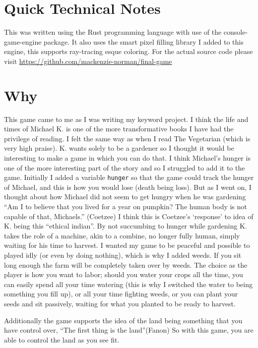 \documentclass{article}
\begin{document}
\section*{Quick Technical Notes }
This was written using the Rust programming language with use of the console-game-engine package. It also uses the smart pixel filling library I added to this engine, this supports ray-tracing esque coloring. For the actual source code please visit \url{https://github.com/mackenzie-norman/final-game}


\section*{Why}
This game came to me as I was writing my keyword project. I think the life and times of Michael K. is one of the more transformative books I have had the privilege of reading. I felt the same way as when I read The Vegetarian (which is very high praise).
K. wants solely to be a gardener so I thought it would be interesting to make a game in which you can do that. I think Michael's hunger is one of the more interesting part of the story and so I struggled to add it to the game. Initially I added a variable \lstinline[language=c]|hunger| so that the game could track the hunger of Michael, and this is how you would lose (death being loss). But as I went on, I thought about how Michael did not seem to get hungry when he was gardening ``Am I to believe that you lived for a year on pumpkin? The human body is not capable of that, Michaels.'' (Coetzee)
I think this is Coetzee's `response' to idea of K. being this ``ethical indian''. By not succumbing to hunger while gardening K. takes the role of a machine, akin to a combine, no longer fully human, simply waiting for his time to harvest. 
I wanted my game to be peaceful and possible to played idly (or even by doing nothing), which is why I added weeds. If you sit long enough the farm will be completely taken over by weeds. The choice as the player is how you want to labor; should you water your crops all the time, you can easily spend all your time watering (this is why I switched the water to being something you fill up), or all your time fighting weeds, or you can plant your seeds and sit passively, waiting for what you planted to be ready to harvest.

Additionally the game supports the idea of the land being something that you have control over, ``The first thing is the land''(Fanon) So with this game, you are able to control the land as you see fit. 
\end{document}
